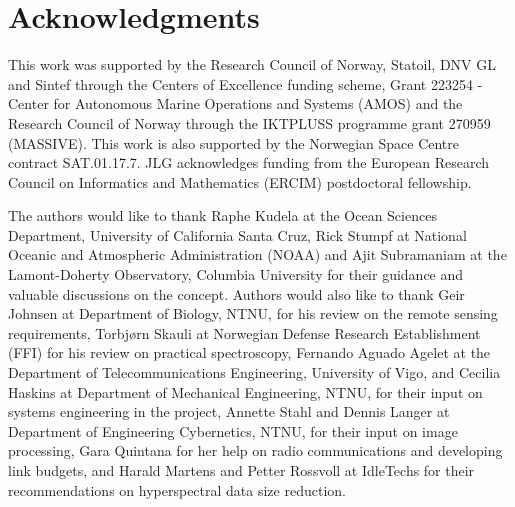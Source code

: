 \section*{Acknowledgments}
This work was supported by the Research Council of Norway, Statoil, DNV GL and Sintef through the Centers of Excellence funding scheme, Grant 223254 - Center for Autonomous Marine Operations and Systems (AMOS) and the Research Council of Norway through the IKTPLUSS programme grant 270959 (MASSIVE). This work is also supported by the Norwegian Space Centre contract SAT.01.17.7. JLG acknowledges funding from the European Research Council on Informatics and Mathematics (ERCIM) postdoctoral fellowship.

The authors would like to thank Raphe Kudela at the Ocean Sciences Department, University of California Santa Cruz, Rick Stumpf at National Oceanic and Atmospheric Administration (NOAA) and Ajit Subramaniam at the Lamont-Doherty Observatory, Columbia University for their guidance and valuable discussions on the concept. Authors would also like to thank Geir Johnsen at Department of Biology, NTNU, for his review on the remote sensing requirements, Torbjørn Skauli at Norwegian Defense Research Establishment (FFI) for his review on  practical spectroscopy, Fernando Aguado Agelet at the Department of Telecommunications Engineering, University of Vigo, and Cecilia Haskins at Department of Mechanical Engineering, NTNU, for their input on systems engineering in the project, Annette Stahl and Dennis Langer at Department of Engineering Cybernetics, NTNU, for their input on image processing, Gara Quintana for her help on radio communications and developing link budgets, and Harald Martens and Petter Rossvoll at IdleTechs for their recommendations on hyperspectral data size reduction. 
